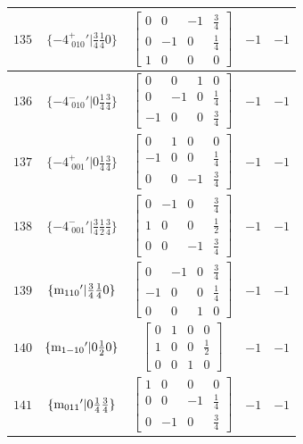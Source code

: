 \documentclass[fleqn,8pt]{jsarticle}
\begin{document}
\begin{longtable}{ccccc}
$ 135 $ & $ \{-4^{+}_{\,\,010}{}'|\frac{3}{4} \frac{1}{4} 0\} $ & $ \begin{bmatrix} 0 & 0 & -1 & \frac{3}{4} \\ 0 & -1 & 0 & \frac{1}{4} \\ 1 & 0 & 0 & 0 \end{bmatrix} $ & $ -1 $ & $ -1 $ \\ \hline
$ 136 $ & $ \{-4^{-}_{\,\,010}{}'|0 \frac{1}{4} \frac{3}{4}\} $ & $ \begin{bmatrix} 0 & 0 & 1 & 0 \\ 0 & -1 & 0 & \frac{1}{4} \\ -1 & 0 & 0 & \frac{3}{4} \end{bmatrix} $ & $ -1 $ & $ -1 $ \\ \hline
$ 137 $ & $ \{-4^{+}_{\,\,001}{}'|0 \frac{1}{4} \frac{3}{4}\} $ & $ \begin{bmatrix} 0 & 1 & 0 & 0 \\ -1 & 0 & 0 & \frac{1}{4} \\ 0 & 0 & -1 & \frac{3}{4} \end{bmatrix} $ & $ -1 $ & $ -1 $ \\ \hline
$ 138 $ & $ \{-4^{-}_{\,\,001}{}'|\frac{3}{4} \frac{1}{2} \frac{3}{4}\} $ & $ \begin{bmatrix} 0 & -1 & 0 & \frac{3}{4} \\ 1 & 0 & 0 & \frac{1}{2} \\ 0 & 0 & -1 & \frac{3}{4} \end{bmatrix} $ & $ -1 $ & $ -1 $ \\ \hline
$ 139 $ & $ \{{\rm m}_{110}{}'|\frac{3}{4} \frac{1}{4} 0\} $ & $ \begin{bmatrix} 0 & -1 & 0 & \frac{3}{4} \\ -1 & 0 & 0 & \frac{1}{4} \\ 0 & 0 & 1 & 0 \end{bmatrix} $ & $ -1 $ & $ -1 $ \\ \hline
$ 140 $ & $ \{{\rm m}_{1-10}{}'|0 \frac{1}{2} 0\} $ & $ \begin{bmatrix} 0 & 1 & 0 & 0 \\ 1 & 0 & 0 & \frac{1}{2} \\ 0 & 0 & 1 & 0 \end{bmatrix} $ & $ -1 $ & $ -1 $ \\ \hline
$ 141 $ & $ \{{\rm m}_{011}{}'|0 \frac{1}{4} \frac{3}{4}\} $ & $ \begin{bmatrix} 1 & 0 & 0 & 0 \\ 0 & 0 & -1 & \frac{1}{4} \\ 0 & -1 & 0 & \frac{3}{4} \end{bmatrix} $ & $ -1 $ & $ -1 $ \\ \hline

\end{longtable}
\end{document}
